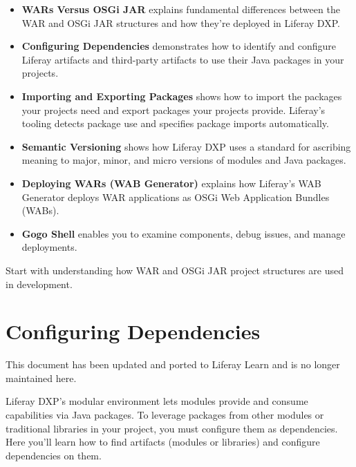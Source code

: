 \begin{itemize}
\item
  \textbf{WARs Versus OSGi JAR} explains fundamental differences between
  the WAR and OSGi JAR structures and how they're deployed in Liferay
  DXP.
\item
  \textbf{Configuring Dependencies} demonstrates how to identify and
  configure Liferay artifacts and third-party artifacts to use their
  Java packages in your projects.
\item
  \textbf{Importing and Exporting Packages} shows how to import the
  packages your projects need and export packages your projects provide.
  Liferay's tooling detects package use and specifies package imports
  automatically.
\item
  \textbf{Semantic Versioning} shows how Liferay DXP uses a standard for
  ascribing meaning to major, minor, and micro versions of modules and
  Java packages.
\item
  \textbf{Deploying WARs (WAB Generator)} explains how Liferay's WAB
  Generator deploys WAR applications as OSGi Web Application Bundles
  (WABs).
\item
  \textbf{Gogo Shell} enables you to examine components, debug issues,
  and manage deployments.
\end{itemize}

Start with understanding how WAR and OSGi JAR project structures are
used in development.

\chapter{Configuring Dependencies}\label{configuring-dependencies}

{ This document has been updated and ported to Liferay Learn and is no
longer maintained here.}

Liferay DXP's modular environment lets modules provide and consume
capabilities via Java packages. To leverage packages from other modules
or traditional libraries in your project, you must configure them as
dependencies. Here you'll learn how to find artifacts (modules or
libraries) and configure dependencies on them.

